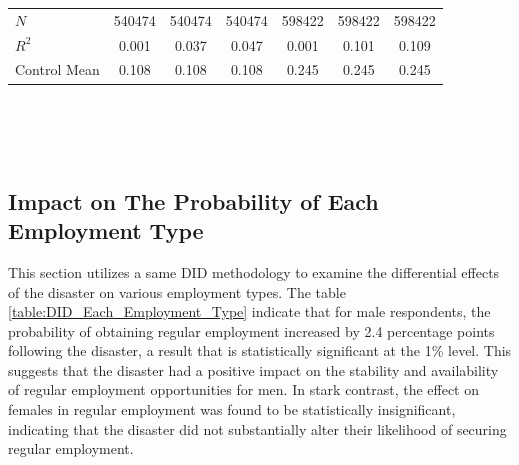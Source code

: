 \documentclass[a4paper,12pt]{article}
\begin{document}
\begin{table}[htbp]
{\begin{tabular}{@{}l*{6}{c}@{}}
$\textit{N}$&   540474         &   540474         &   540474         &   598422         &   598422         &   598422         \\
$\textit{R}^2$&    0.001         &    0.037         &    0.047         &    0.001         &    0.101         &    0.109         \\
Control Mean&    0.108         &    0.108         &    0.108         &    0.245         &    0.245         &    0.245         \\
\bottomrule
\end{tabular}}
\\\\
\\

\label{table:DID_Non_Regular_Worker}

\end{table}






\subsection{Impact on The Probability of Each Employment Type}


This section utilizes a same DID methodology to examine the differential effects of the disaster on various employment types. The table \ref{table:DID_Each_Employment_Type} indicate that for male respondents, the probability of obtaining regular employment increased by 2.4 percentage points following the disaster, a result that is statistically significant at the 1\% level. This suggests that the disaster had a positive impact on the stability and availability of regular employment opportunities for men. In stark contrast, the effect on females in regular employment was found to be statistically insignificant, indicating that the disaster did not substantially alter their likelihood of securing regular employment.
\end{document}
